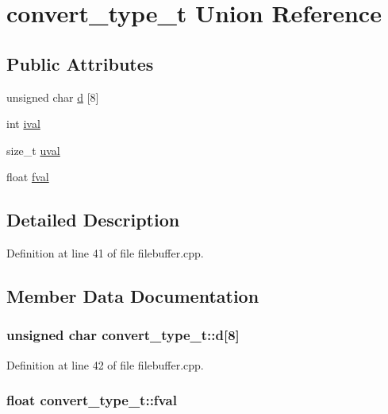\hypertarget{unionconvert__type__t}{\section{convert\-\_\-type\-\_\-t Union Reference}
\label{unionconvert__type__t}
}
\subsection*{Public Attributes}
\begin{DoxyCompactItemize}
\item 
unsigned char \hyperlink{unionconvert__type__t_a6f76840d6875059c2655f53246c5a5a1}{d} \mbox{[}8\mbox{]}
\item 
int \hyperlink{unionconvert__type__t_a9eef931dacbc2c9fe0b67edc5e053624}{ival}
\item 
size\-\_\-t \hyperlink{unionconvert__type__t_ab2a3ae21cfb1610cc473234ce3e7661e}{uval}
\item 
float \hyperlink{unionconvert__type__t_aa56281b3a5e206689c30ce623aa6dc0b}{fval}
\end{DoxyCompactItemize}


\subsection{Detailed Description}


Definition at line 41 of file filebuffer.\-cpp.



\subsection{Member Data Documentation}
\hypertarget{unionconvert__type__t_a6f76840d6875059c2655f53246c5a5a1}{
\subsubsection[{d}]{\setlength{\rightskip}{0pt plus 5cm}unsigned char convert\-\_\-type\-\_\-t\-::d\mbox{[}8\mbox{]}}}\label{unionconvert__type__t_a6f76840d6875059c2655f53246c5a5a1}


Definition at line 42 of file filebuffer.\-cpp.

\hypertarget{unionconvert__type__t_aa56281b3a5e206689c30ce623aa6dc0b}{
\subsubsection[{fval}]{\setlength{\rightskip}{0pt plus 5cm}float convert\-\_\-type\-\_\-t\-::fval}}\label{unionconvert__type__t_aa56281b3a5e206689c30ce623aa6dc0b}


